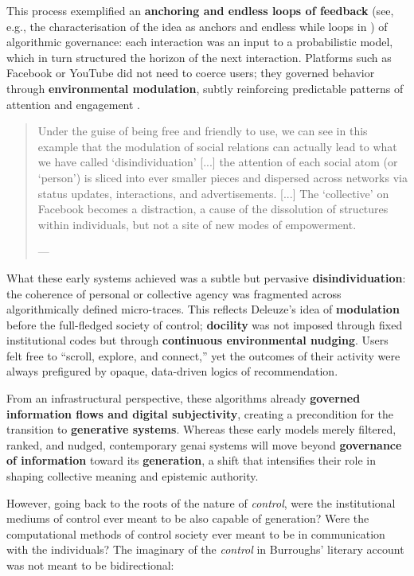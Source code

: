 This process exemplified an \textbf{anchoring and endless loops of feedback} (see, e.g., the characterisation of the idea as anchors and endless while loops in \cite[34--35]{demir2019}) of algorithmic governance: each interaction was an input to a probabilistic model, which in turn structured the horizon of the next interaction. Platforms such as Facebook or YouTube did not need to coerce users; they governed behavior through \textbf{environmental modulation}, subtly reinforcing predictable patterns of attention and engagement \parencite[29--32]{demir2019}.

\begin{quote}
	Under the guise of being free and friendly to use, we can see in this example that the modulation of social relations can actually lead to what we have called ‘disindividuation’ [...] the attention of each social atom (or ‘person’) is sliced into ever smaller pieces and dispersed across networks via status updates, interactions, and advertisements. [...] The ‘collective’ on Facebook becomes a distraction, a cause of the dissolution of structures within individuals, but not a site of new modes of empowerment.

	--- \cite[90]{hui2015}
\end{quote}

What these early systems achieved was a subtle but pervasive \textbf{disindividuation}: the coherence of personal or collective agency was fragmented across algorithmically defined micro-traces. This reflects Deleuze’s idea of \textbf{modulation} before the full-fledged society of control; \textbf{docility} was not imposed through fixed institutional codes but through \textbf{continuous environmental nudging}. Users felt free to “scroll, explore, and connect,” yet the outcomes of their activity were always prefigured by opaque, data-driven logics of recommendation.

From an infrastructural perspective, these algorithms already \textbf{governed information flows and digital subjectivity}, creating a precondition for the transition to \textbf{generative systems}. Whereas these early models merely filtered, ranked, and nudged, contemporary \gls{genai} systems will move beyond \textbf{governance of information} toward its \textbf{generation}, a shift that intensifies their role in shaping collective meaning and epistemic authority.

However, going back to the roots of the nature of
\textit{control}, were the
institutional mediums of control ever meant to be also capable of generation?
Were the computational methods of control society ever meant to be in
communication with the individuals? The imaginary of the \textit{control} in Burroughs'
literary account was not meant to be bidirectional:

